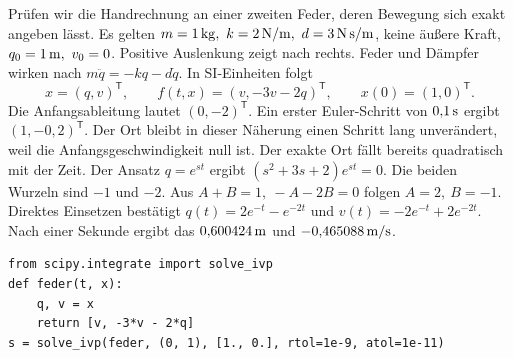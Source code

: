 Prüfen wir die Handrechnung an einer zweiten Feder, deren Bewegung sich exakt angeben lässt. Es gelten \(m=1\unitm{kg},\ k=2\unitm{N/m},\ d=3\unitm{N\,s/m}\), keine äußere Kraft, \(q_0=1\,\mathrm{m},\ v_0=0\). Positive Auslenkung zeigt nach rechts. Feder und Dämpfer wirken nach \(m\ddot q=-kq-d\dot q\). In SI-Einheiten folgt
\[
 x=(q,v)^\mathsf T,\qquad f(t,x)=(v,-3v-2q)^\mathsf T,\qquad x(0)=(1,0)^\mathsf T.
\]
Die Anfangsableitung lautet \((0,-2)^\mathsf T\). Ein erster Euler-Schritt von \(0{,}1\,\mathrm{s}\) ergibt \((1,-0{,}2)^\mathsf T\). Der Ort bleibt in dieser Näherung einen Schritt lang unverändert, weil die Anfangsgeschwindigkeit null ist. Der exakte Ort fällt bereits quadratisch mit der Zeit.
Der Ansatz \(q=e^{st}\) ergibt \((s^2+3s+2)e^{st}=0\). Die beiden Wurzeln sind \(-1\) und \(-2\). Aus \(A+B=1,\ -A-2B=0\) folgen \(A=2,\ B=-1\). Direktes Einsetzen bestätigt \(q(t)=2e^{-t}-e^{-2t}\) und \(v(t)=-2e^{-t}+2e^{-2t}\). Nach einer Sekunde ergibt das \(0{,}600424\,\mathrm{m}\) und \(-0{,}465088\,\mathrm{m/s}\).
{\small\begin{verbatim}
from scipy.integrate import solve_ivp
def feder(t, x):
    q, v = x
    return [v, -3*v - 2*q]
s = solve_ivp(feder, (0, 1), [1., 0.], rtol=1e-9, atol=1e-11)
\end{verbatim}}

